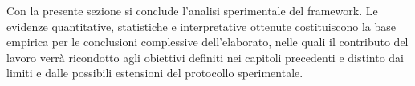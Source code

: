 Con la presente sezione si conclude l'analisi sperimentale del framework.
Le evidenze quantitative, statistiche e interpretative ottenute costituiscono la base empirica per le conclusioni complessive dell'elaborato, nelle quali il contributo del lavoro verrà ricondotto agli obiettivi definiti nei capitoli precedenti e distinto dai limiti e dalle possibili estensioni del protocollo sperimentale.
